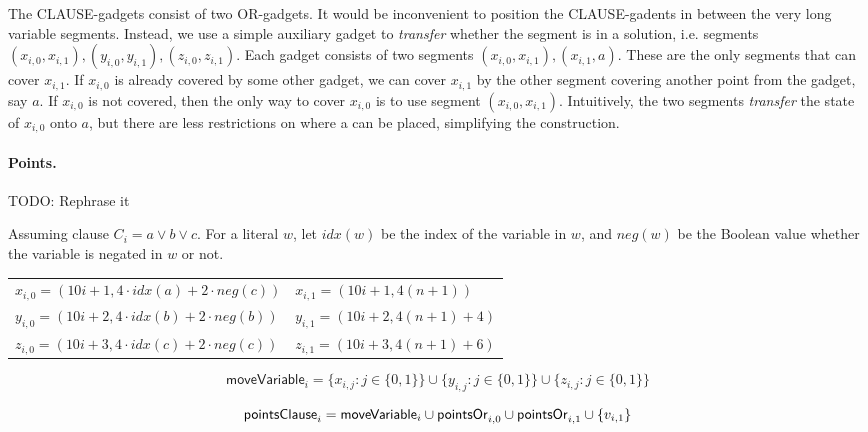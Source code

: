 The CLAUSE-gadgets consist of two OR-gadgets.
It would be inconvenient to position the CLAUSE-gadents
in between the very long variable segments.
Instead, we use a simple auxiliary gadget to
\textit{transfer} whether the segment
is in a solution, i.e. segments
$(x_{i, 0}, x_{i, 1}), (y_{i, 0}, y_{i, 1}), (z_{i, 0}, z_{i, 1})$.
Each gadget consists of two segments $(x_{i, 0}, x_{i, 1}), (x_{i, 1}, a)$.
These are the only segments that can cover $x_{i,1}$.
If $x_{i,0}$ is already covered by some other gadget,
we can cover $x_{i,1}$ by the other segment covering another point
from the gadget, say $a$.
If $x_{i,0}$ is not covered, then the only way to cover $x_{i,0}$
is to use segment $(x_{i, 0}, x_{i, 1})$.
Intuitively, the two segments \textit{transfer} the state of $x_{i,0}$
onto $a$, but there are less restrictions on where a can be placed,
simplifying the construction.

\paragraph{Points.}

\newcommand{\pointsClause}{\mathsf{pointsClause}}



TODO: Rephrase it

Assuming clause $C_i = a \lor b \lor c$.
For a literal $w$, let $idx(w)$ be the index of the variable in $w$,
and $neg(w)$ be the Boolean value whether the variable is negated in $w$
or not.

\begin{center}
\begin{tabular}{ l l }
	$x_{i, 0} = (10i+1, 4\cdot idx(a) + 2\cdot neg(c))$ &
	$x_{i, 1} = (10i+1, 4(n+1))$ \\
	$y_{i, 0} = (10i+2, 4\cdot idx(b) + 2\cdot neg(b))$ &
	$y_{i, 1} = (10i+2, 4(n+1) + 4)$ \\
	$z_{i, 0} = (10i+3, 4\cdot idx(c) + 2\cdot neg(c))$ &
	$z_{i, 1} = (10i+3, 4(n+1) + 6)$
\end{tabular}
\end{center}

\newcommand{\segmentsClause}{\mathsf{segmentsClause}}	
 
 $$\mathsf{moveVariable}_i = 
 \{x_{i, j} : j \in \{0, 1\}\} \cup
 \{y_{i, j} : j \in \{0, 1\}\} \cup
 \{z_{i, j} : j \in \{0, 1\}\} 
 $$
 
 $$\pointsClause_i = 
 \mathsf{moveVariable}_i \cup \pointsOr{i}{0}
 \cup \pointsOr{i}{1} \cup \{v_{i, 1} \} 
 $$
 
